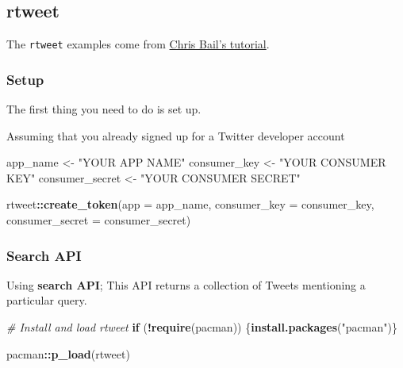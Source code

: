 \documentclass[
]{book}
\newenvironment{Shaded}{\begin{snugshade}}{\end{snugshade}}
\newcommand{\AttributeTok}[1]{\textcolor[rgb]{0.13,0.29,0.53}{#1}}
\newcommand{\CommentTok}[1]{\textcolor[rgb]{0.56,0.35,0.01}{\textit{#1}}}
\newcommand{\ControlFlowTok}[1]{\textcolor[rgb]{0.13,0.29,0.53}{\textbf{#1}}}
\newcommand{\FunctionTok}[1]{\textcolor[rgb]{0.13,0.29,0.53}{\textbf{#1}}}
\newcommand{\NormalTok}[1]{#1}
\newcommand{\OtherTok}[1]{\textcolor[rgb]{0.56,0.35,0.01}{#1}}
\newcommand{\SpecialCharTok}[1]{\textcolor[rgb]{0.81,0.36,0.00}{\textbf{#1}}}
\newcommand{\StringTok}[1]{\textcolor[rgb]{0.31,0.60,0.02}{#1}}
\begin{document}
\subsection{rtweet}\label{rtweet}

The \texttt{rtweet} examples come from \href{https://cbail.github.io/SICSS_APIs_markdown.html}{Chris Bail's tutorial}.

\subsubsection{Setup}\label{setup-5}

The first thing you need to do is set up.

Assuming that you already signed up for a Twitter developer account

\begin{Shaded}
\begin{Highlighting}[]
\NormalTok{app\_name }\OtherTok{\textless{}{-}} \StringTok{"YOUR APP NAME"}
\NormalTok{consumer\_key }\OtherTok{\textless{}{-}} \StringTok{"YOUR CONSUMER KEY"}
\NormalTok{consumer\_secret }\OtherTok{\textless{}{-}} \StringTok{"YOUR CONSUMER SECRET"}

\NormalTok{rtweet}\SpecialCharTok{::}\FunctionTok{create\_token}\NormalTok{(}\AttributeTok{app =}\NormalTok{ app\_name, }
                     \AttributeTok{consumer\_key =}\NormalTok{ consumer\_key, }
                     \AttributeTok{consumer\_secret =}\NormalTok{ consumer\_secret)}
\end{Highlighting}
\end{Shaded}

\subsubsection{Search API}\label{search-api}

Using \textbf{search API}; This API returns a collection of Tweets mentioning a particular query.

\begin{Shaded}
\begin{Highlighting}[]
\CommentTok{\# Install and load rtweet }
\ControlFlowTok{if}\NormalTok{ (}\SpecialCharTok{!}\FunctionTok{require}\NormalTok{(pacman)) \{}\FunctionTok{install.packages}\NormalTok{(}\StringTok{"pacman"}\NormalTok{)\}}

\NormalTok{pacman}\SpecialCharTok{::}\FunctionTok{p\_load}\NormalTok{(rtweet)}
\end{Highlighting}
\end{Shaded}
\end{document}
